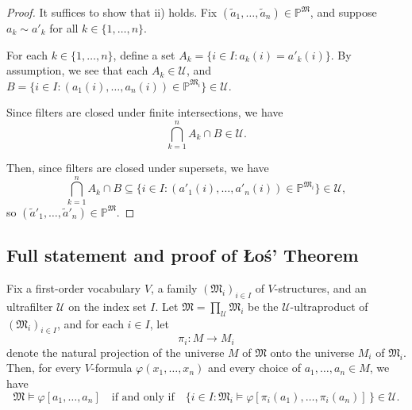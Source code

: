 \documentclass{scrartcl}
\renewcommand{\phi}{\varphi}
\newcommand{\FM}{\mathfrak{M}}
\newcommand{\SU}{\mathscr{U}}
\begin{document}
\begin{proof}
It suffices to show that ii) holds. Fix $(\tilde{a}_1,\dots,\tilde{a}_n) \in \mathbb{P}^\FM$, and suppose $ a_k\sim a'_k $ for all $k\in\{1,\dots, n\}$.

For each $ k\in \{ 1, \dots, n \} $, define a set $A_k = \{ i\in I \colon a_k(i) = a'_k(i) \}$. By assumption, we see that each $A_k \in \SU$, and $ B = \{i\in I\colon (a_1(i),\dots,a_n(i))\in \mathbb{P}^{\FM_i} \} \in\mathscr{U} $.

Since filters are closed under finite intersections, we have
\[
\bigcap \limits_{k=1}^n A_k \cap B \in \mathscr{U}.
\]

Then, since filters are closed under supersets, we have
\[
\bigcap \limits_{k=1}^n A_k \cap B \subseteq \{ i\in I \colon (a'_1(i), \dots, a'_n(i)) \in \mathbb{P}^{\FM_i} \} \in \SU,
\]
so $(\tilde{a}'_1,\dots,\tilde{a}'_n) \in \mathbb{P}^\FM$.
\end{proof}




\subsection{Full statement and proof of \L o\'s' Theorem}
\label{S:Los theorem}

\begin{theorem}
\label{T:Los full statement}

Fix a first-order vocabulary $V$, a family $(\mathfrak{M}_i)_{i\in I}$ of $V$-structures, and an ultrafilter $\mathscr{U}$ on the index set $I$. Let $\FM=\prod_\mathscr{U}\FM _i$ be the $\SU$-ultraproduct  of  $(\mathfrak{M}_i)_{i\in I}$, and for each $i\in I$, let
\[
\pi_i : M \to M_i 
\]
denote the natural projection of the universe $M$ of $\FM$ onto the universe $M_i$ of $\FM_i$. Then, for every $V$-formula $\phi(x_1, \dots, x_n)$ and every choice of $a_1,\dots, a_n\in M$, we have
\[
\tag{Ł}
\mathfrak{M}\models \phi[a_1, \dots, a_n]
\quad\text{if and only if}\quad
\{i\in I \colon \mathfrak{M}_i\models \phi[\pi_i(a_1), \dots, \pi_i(a_n)]\,\}\in \mathscr{U}.
\]
\end{theorem}
\end{document}
